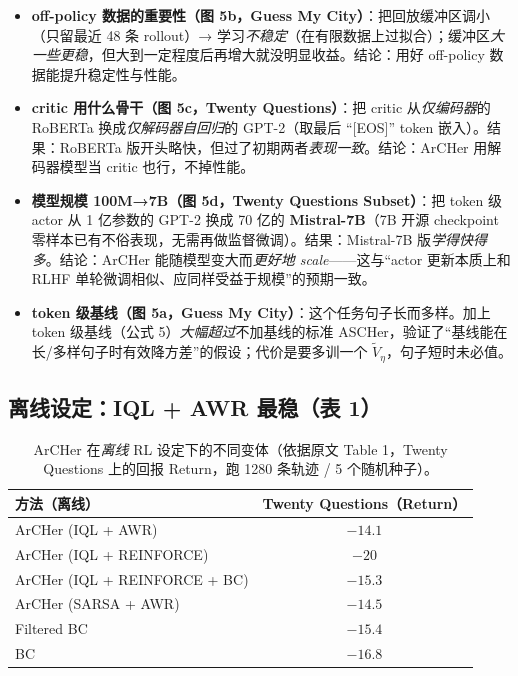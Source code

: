 \documentclass[11pt,UTF8,fontset=fandol]{ctexart}
\begin{document}
\begin{itemize}[leftmargin=1.5em]
\item \textbf{off-policy 数据的重要性（图 5b，Guess My City）}：把回放缓冲区调小（只留最近 48 条 rollout）→ 学习\emph{不稳定}（在有限数据上过拟合）；缓冲区\emph{大一些更稳}，但大到一定程度后再增大就没明显收益。结论：用好 off-policy 数据能提升稳定性与性能。
\item \textbf{critic 用什么骨干（图 5c，Twenty Questions）}：把 critic 从\emph{仅编码器}的 RoBERTa 换成\emph{仅解码器自回归}的 GPT-2（取最后 “[EOS]” token 嵌入）。结果：RoBERTa 版开头略快，但过了初期两者\emph{表现一致}。结论：ArCHer 用解码器模型当 critic 也行，不掉性能。
\item \textbf{模型规模 100M→7B（图 5d，Twenty Questions Subset）}：把 token 级 actor 从 1 亿参数的 GPT-2 换成 70 亿的 \textbf{Mistral-7B}（7B 开源 checkpoint 零样本已有不俗表现，无需再做监督微调）。结果：Mistral-7B 版\emph{学得快得多}。结论：ArCHer 能随模型变大而\emph{更好地 scale}——这与“actor 更新本质上和 RLHF 单轮微调相似、应同样受益于规模”的预期一致。
\item \textbf{token 级基线（图 5a，Guess My City）}：这个任务句子长而多样。加上 token 级基线（公式 5）\emph{大幅超过}不加基线的标准 ASCHer，验证了“基线能在长/多样句子时有效降方差”的假设；代价是要多训一个 $\widetilde{V}_\eta$，句子短时未必值。
\end{itemize}

\subsection{离线设定：IQL + AWR 最稳（表 1）}

\begin{table}[H]\centering\caption{ArCHer 在\emph{离线} RL 设定下的不同变体（依据原文 Table 1，Twenty Questions 上的回报 Return，跑 1280 条轨迹 / 5 个随机种子）。}
\begin{tabular}{@{}lc@{}}
\toprule
\textbf{方法（离线）} & \textbf{Twenty Questions（Return）} \\ \midrule
ArCHer (IQL + AWR)            & $-14.1$ \\
ArCHer (IQL + REINFORCE)      & $-20$ \\
ArCHer (IQL + REINFORCE + BC) & $-15.3$ \\
ArCHer (SARSA + AWR)          & $-14.5$ \\
Filtered BC                   & $-15.4$ \\
BC                            & $-16.8$ \\
\bottomrule
\end{tabular}
\end{table}
\end{document}
